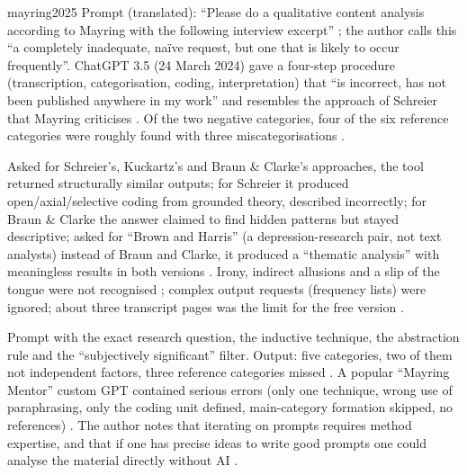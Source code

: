 \begin{papercard}{mayring2025}
 Prompt (translated): ``Please do a qualitative content analysis according to Mayring with the following interview excerpt'' ; the author calls this ``a completely inadequate, naïve request, but one that is likely to occur frequently''. ChatGPT 3.5 (24 March 2024) gave a four-step procedure (transcription, categorisation, coding, interpretation) that ``is incorrect, has not been published anywhere in my work'' and resembles the approach of Schreier that Mayring criticises . Of the two negative categories, four of the six reference categories were roughly found with three miscategorisations .

 Asked for Schreier's, Kuckartz's and Braun \& Clarke's approaches, the tool returned structurally similar outputs; for Schreier it produced open/axial/selective coding from grounded theory, described incorrectly; for Braun \& Clarke the answer claimed to find hidden patterns but stayed descriptive; asked for ``Brown and Harris'' (a depression-research pair, not text analysts) instead of Braun and Clarke, it produced a ``thematic analysis'' with meaningless results in both versions . Irony, indirect allusions and a slip of the tongue were not recognised ; complex output requests (frequency lists) were ignored; about three transcript pages was the limit for the free version .

 Prompt with the exact research question, the inductive technique, the abstraction rule and the ``subjectively significant'' filter. Output: five categories, two of them not independent factors, three reference categories missed . A popular ``Mayring Mentor'' custom GPT contained serious errors (only one technique, wrong use of paraphrasing, only the coding unit defined, main-category formation skipped, no references) . The author notes that iterating on prompts requires method expertise, and that if one has precise ideas to write good prompts one could analyse the material directly without AI .


\end{papercard}
